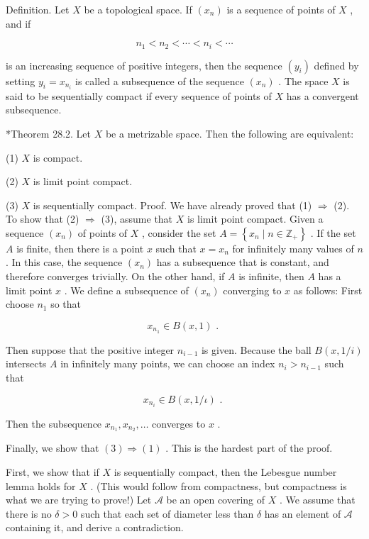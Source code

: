 Definition. Let \(X\) be a topological space. If \(\left( {x}_{n}\right)\) is a sequence of points of \(X\) , and if

\[
{n}_{1} < {n}_{2} < \cdots  < {n}_{i} < \cdots
\]

is an increasing sequence of positive integers, then the sequence \(\left( {y}_{i}\right)\) defined by setting \({y}_{i} = {x}_{{n}_{i}}\) is called a subsequence of the sequence \(\left( {x}_{n}\right)\) . The space \(X\) is said to be sequentially compact if every sequence of points of \(X\) has a convergent subsequence.

*Theorem 28.2. Let \(X\) be a metrizable space. Then the following are equivalent:

(1) \(X\) is compact.

(2) \(X\) is limit point compact.

(3) \(X\) is sequentially compact. Proof. We have already proved that (1) \(\Rightarrow\) (2). To show that (2) \(\Rightarrow\) (3), assume that \(X\) is limit point compact. Given a sequence \(\left( {x}_{n}\right)\) of points of \(X\) , consider the set \(A = \left\{  {{x}_{n} \mid  n \in  {\mathbb{Z}}_{ + }}\right\}\) . If the set \(A\) is finite, then there is a point \(x\) such that \(x = {x}_{n}\) for infinitely many values of \(n\) . In this case, the sequence \(\left( {x}_{n}\right)\) has a subsequence that is constant, and therefore converges trivially. On the other hand, if \(A\) is infinite, then \(A\) has a limit point \(x\) . We define a subsequence of \(\left( {x}_{n}\right)\) converging to \(x\) as follows: First choose \({n}_{1}\) so that

\[
{x}_{{n}_{1}} \in  B\left( {x,1}\right) \text{ . }
\]

Then suppose that the positive integer \({n}_{i - 1}\) is given. Because the ball \(B\left( {x,1/i}\right)\) intersects \(A\) in infinitely many points, we can choose an index \({n}_{i} > {n}_{i - 1}\) such that

\[
{x}_{{n}_{i}} \in  B\left( {x,1/\iota }\right) \text{ . }
\]

Then the subsequence \({x}_{{n}_{1}},{x}_{{n}_{2}},\ldots\) converges to \(x\) .

Finally, we show that \(\left( 3\right)  \Rightarrow  \left( 1\right)\) . This is the hardest part of the proof.

First, we show that if \(X\) is sequentially compact, then the Lebesgue number lemma holds for \(X\) . (This would follow from compactness, but compactness is what we are trying to prove!) Let \(\mathcal{A}\) be an open covering of \(X\) . We assume that there is no \(\delta  > 0\) such that each set of diameter less than \(\delta\) has an element of \(\mathcal{A}\) containing it, and derive a contradiction.


